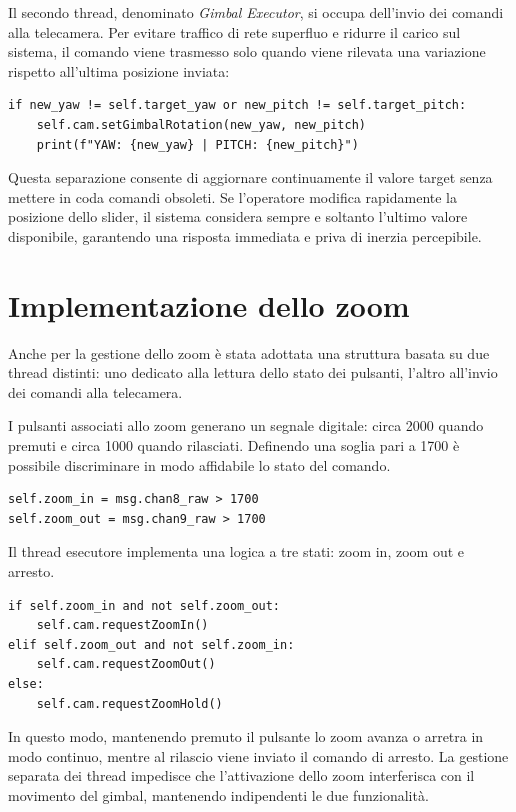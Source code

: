 Il secondo thread, denominato \textit{Gimbal Executor}, si occupa dell’invio dei comandi alla telecamera.
Per evitare traffico di rete superfluo e ridurre il carico sul sistema,
il comando viene trasmesso solo quando viene rilevata una variazione rispetto all’ultima posizione inviata:

\begin{verbatim}
if new_yaw != self.target_yaw or new_pitch != self.target_pitch:
    self.cam.setGimbalRotation(new_yaw, new_pitch)
    print(f"YAW: {new_yaw} | PITCH: {new_pitch}")
\end{verbatim}

Questa separazione consente di aggiornare continuamente il valore target
senza mettere in coda comandi obsoleti.
Se l’operatore modifica rapidamente la posizione dello slider,
il sistema considera sempre e soltanto l’ultimo valore disponibile,
garantendo una risposta immediata e priva di inerzia percepibile.

\bigskip
\section*{Implementazione dello zoom}

\bigskip

Anche per la gestione dello zoom è stata adottata una struttura basata su due thread distinti:
uno dedicato alla lettura dello stato dei pulsanti,
l’altro all’invio dei comandi alla telecamera.

I pulsanti associati allo zoom generano un segnale digitale:
circa 2000 quando premuti e circa 1000 quando rilasciati.
Definendo una soglia pari a 1700 è possibile discriminare in modo affidabile
lo stato del comando.

\begin{verbatim}
self.zoom_in = msg.chan8_raw > 1700
self.zoom_out = msg.chan9_raw > 1700
\end{verbatim}

Il thread esecutore implementa una logica a tre stati:
zoom in, zoom out e arresto.

\begin{verbatim}
if self.zoom_in and not self.zoom_out:
    self.cam.requestZoomIn()
elif self.zoom_out and not self.zoom_in:
    self.cam.requestZoomOut()
else:
    self.cam.requestZoomHold()
\end{verbatim}

In questo modo, mantenendo premuto il pulsante lo zoom avanza o arretra in modo continuo,
mentre al rilascio viene inviato il comando di arresto.
La gestione separata dei thread impedisce che l’attivazione dello zoom interferisca
con il movimento del gimbal, mantenendo indipendenti le due funzionalità.

